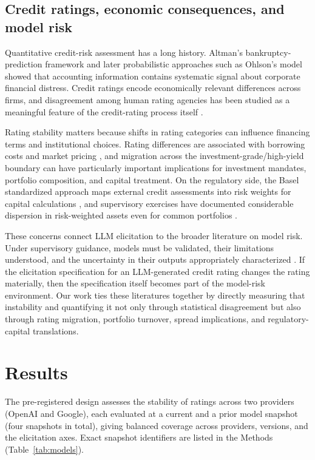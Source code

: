 \documentclass[a4paper,fleqn]{cas-sc}
\begin{document}
\subsection{Credit ratings, economic consequences, and model risk}
Quantitative credit-risk assessment has a long history. Altman's bankruptcy-prediction framework
\citep{altman1968} and later probabilistic approaches such as Ohlson's model \citep{ohlson1980} showed
that accounting information contains systematic signal about corporate financial distress. Credit ratings
encode economically relevant differences across firms, and disagreement among human rating agencies has
been studied as a meaningful feature of the credit-rating process itself
\citep{cantorpacker1997,kligersarig2000,tang2009}.

Rating stability matters because shifts in rating categories can influence financing terms and
institutional choices. Rating differences are associated with borrowing costs and
market pricing \citep{kligersarig2000,tang2009,cornaggia2018}, and migration across the
investment-grade/high-yield boundary can have particularly important implications for investment
mandates, portfolio composition, and capital treatment. On the regulatory side, the Basel standardized
approach maps external credit assessments into risk weights for capital calculations
\citep{bcbs2019cre20}, and supervisory exercises have documented considerable dispersion in risk-weighted
assets even for common portfolios \citep{bcbs2013rcap}.

These concerns connect LLM elicitation to the broader literature on model risk. Under supervisory
guidance, models must be validated, their limitations understood, and the uncertainty in their outputs
appropriately characterized \citep{srletter2011}. If the elicitation specification for an LLM-generated
credit rating changes the rating materially, then the specification itself becomes part of the model-risk
environment. Our work ties these literatures together by directly measuring that instability and
quantifying it not only through statistical disagreement but also through rating migration, portfolio
turnover, spread implications, and regulatory-capital translations.

\section{Results}
The pre-registered design assesses the stability of ratings across two providers (OpenAI and Google),
each evaluated at a current and a prior model snapshot (four snapshots in total), giving balanced
coverage across providers, versions, and the elicitation axes. Exact snapshot identifiers are listed in
the Methods (Table~\ref{tab:models}).
\end{document}
